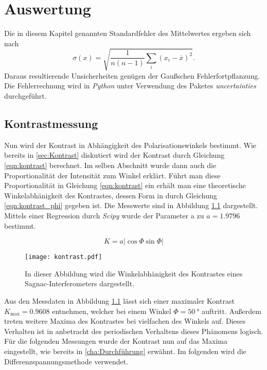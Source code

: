 \chapter{Auswertung}
\label{cha:Auswertung}
Die in diesem Kapitel genannten Standardfehler des Mittelwertes ergeben sich nach
\begin{equation*}
  \label{eqn:MW-Fehler}
  \sigma(x) = \sqrt{\frac{1}{n(n-1)} \sum_i (x_i - \overline{x})^2}.
\end{equation*}
Daraus resultierende Unsicherheiten genügen der Gaußschen Fehlerfortpflanzung.
Die Fehlerrechnung wird in \textit{Python} unter Verwendung des Paketes \textit{uncertainties} \cite{uncertainties} durchgeführt.

\section{Kontrastmessung}
\label{sec:kontrastmessung}
Nun wird der Kontrast in Abhängigkeit des Polarisationswinkels bestimmt. Wie bereits in \autoref{sec:Kontrast} diskutiert wird der Kontrast durch Gleichung \ref{eqn:kontrast} berechnet.
Im selben Abschnitt wurde dann auch die Proportionalität der Intensität zum Winkel erklärt. Führt man diese Proportionalität in Gleichung \ref{eqn:kontrast} ein erhält man eine 
theoretische Winkelabhänigkeit des Kontrastes, dessen Form in durch Gleichung \ref{eqn:kontrast_phi} gegeben ist. Die Messwerte sind in Abbildung \ref{fig:kontrast} dargestellt. Mittels
einer Regression durch \textit{Scipy}\cite{scipy} wurde der Parameter a zu $a = \num{1.9796}$ bestimmt. 

\begin{equation}
  \label{eqn:kontrast_phi}
  K = a\lvert \cos\Phi\sin\Phi\rvert  
\end{equation}
\begin{figure}
    \centering
    \texttt{[image: kontrast.pdf]}
    \caption{In dieser Abbildung wird die Winkelabhänigkeit des Kontrastes eines Sagnac-Interferometers dargestellt.}
    \label{fig:kontrast}
\end{figure}

Aus den Messdaten in Abbildung \ref{fig:kontrast} lässt sich einer maximaler Kontrast $K_\mathrm{max} = 0.9608$ entnehmen, welcher bei einem Winkel $\Phi = \qty{50}{\degree}$ auftritt.
Außerdem treten weitere Maxima des Kontrastes bei vielfachen des Winkels auf. Dieses Verhalten ist in anbetracht des periodischen Verhaltens dieses Phänomens logisch. 
Für die folgenden Messungen wurde der Kontrast nun auf das Maxima eingestellt, wie bereits in \autoref{cha:Durchführung} erwähnt. Im folgenden wird die Differenzspannungsmethode 
verwendet.

